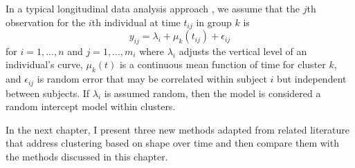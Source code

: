 In a typical longitudinal data analysis approach \cite{diggle2002}, we assume that the $j$th observation for the $i$th individual at time $t_{ij}$ in group $k$ is
$$y_{ij}=\lambda_{i}+\mu_k(t_{ij})+\epsilon_{ij}$$
for $i=1,...,n$ and $j=1,...,m_{i}$ where $\lambda_{i}$ adjusts the vertical level of an individual's curve, $\mu_k(t)$ is a continuous mean function of time for cluster $k$, and $\epsilon_{ij}$ is random error that may be correlated within subject $i$ but independent between subjects. If $\lambda_{i}$ is assumed random, then the model is considered a random intercept model within clusters. 

In the next chapter, I present three new methods adapted from related literature that address clustering based on shape over time and then compare them with the methods discussed in this chapter.	
